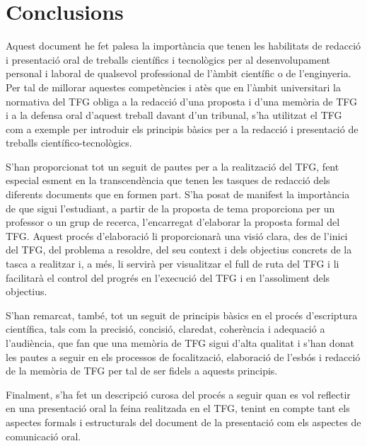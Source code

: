 
\chapter{Conclusions}

Aquest document he fet palesa la importància que tenen les habilitats de redacció i presentació oral de treballs científics i tecnològics per al desenvolupament personal i laboral de qualsevol professional de l'àmbit científic o de l'enginyeria. Per tal de millorar aquestes competències i atès que en l'àmbit universitari la normativa del \ac{TFG} obliga a la redacció d'una proposta i d'una memòria de \ac{TFG} i a la defensa oral d'aquest treball davant d'un tribunal, s'ha utilitzat el \ac{TFG} com a exemple per introduir els principis bàsics per a la redacció i presentació de treballs científico-tecnològics.

S'han proporcionat tot un seguit de pautes per a la realització del \ac{TFG}, fent especial esment en la transcendència que tenen les tasques de redacció dels diferents documents que en formen part. S'ha posat de manifest la importància de que sigui l'estudiant, a partir de la proposta de tema proporciona per un professor o un grup de recerca, l'encarregat d'elaborar la proposta formal del \ac{TFG}. Aquest procés d'elaboració li proporcionarà una visió clara, des de l'inici del \ac{TFG}, del problema a resoldre, del seu context i dels objectius concrets de la tasca a realitzar i, a més, li servirà per visualitzar el full de ruta del \ac{TFG} i li facilitarà el control del progrés en l'execució del \ac{TFG} i en l'assoliment dels objectius.

S'han remarcat, també, tot un seguit de principis bàsics en el procés d'escriptura científica, tals com la precisió, concisió, claredat, coherència i adequació a l'audiència, que fan que una memòria de \ac{TFG} sigui d'alta qualitat i s'han donat les pautes a seguir en els processos de focalització, elaboració de l'esbós i redacció de la memòria de \ac{TFG} per tal de ser fidels a aquests principis.

Finalment, s'ha fet un descripció curosa del procés a seguir quan es vol reflectir en una presentació oral la feina realitzada en el \ac{TFG}, tenint en compte tant els aspectes formals i estructurals del document de la presentació com els aspectes de comunicació oral.
